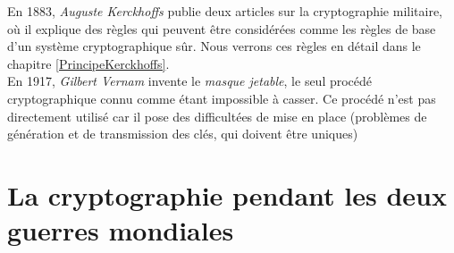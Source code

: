 En 1883, \emph{Auguste Kerckhoffs} publie deux articles sur la
cryptographie militaire, où il explique des règles qui peuvent être
considérées comme les règles de base d'un système cryptographique
sûr. Nous verrons ces règles en détail dans le chapitre
\ref{PrincipeKerckhoffs}. \\

En 1917, \emph{Gilbert Vernam} invente le \emph{masque jetable}, le
seul procédé cryptographique connu comme étant impossible à casser. Ce
procédé n'est pas directement utilisé car il pose des difficultées de
mise en place (problèmes de génération et de transmission des clés,
qui doivent être uniques) %

\section{La cryptographie pendant les deux guerres mondiales}
